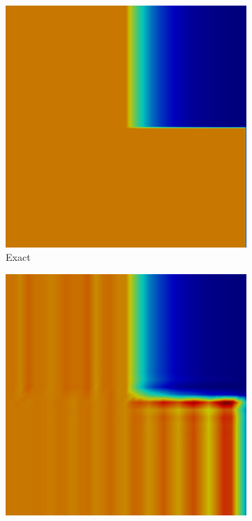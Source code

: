 \begin{figure}[h]
   \centering
   \begin{subfigure}{0.3\textwidth}
      \includegraphics[width=\textwidth]{void_to_absorber/exact.png}
      \caption{Exact}
   \end{subfigure}
   \begin{subfigure}{0.3\textwidth}
      \includegraphics[width=\textwidth]{void_to_absorber/Gal.png}

\end{subfigure}
\end{figure}
